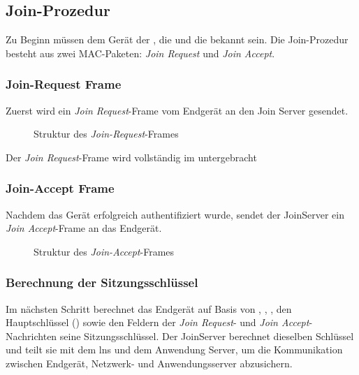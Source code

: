 \subsection{Join-Prozedur}
	Zu Beginn müssen dem Gerät der , die  und die  bekannt sein. Die Join-Prozedur besteht aus zwei MAC-Paketen: \textit{Join Request} und \textit{Join Accept}.

\subsubsection{Join-Request Frame}
	Zuerst wird ein \textit{Join Request}-Frame vom Endgerät an den Join Server gesendet.
	\begin{figure}[H]
		\centering
		\caption{Struktur des \textit{Join-Request}-Frames \cite{LoRaAlliance:2020b}}
	\end{figure}
		
 Der \textit{Join Request}-Frame wird vollständig im  untergebracht \cite{LoRaAlliance:2020b}
		 
		 
		 
\subsubsection{Join-Accept Frame}
	Nachdem das Gerät erfolgreich authentifiziert wurde, sendet der JoinServer ein \textit{Join Accept}-Frame an das Endgerät.
		\begin{figure}[H]
			\centering
			\caption{Struktur des \textit{Join-Accept}-Frames \cite{LoRaAlliance:2020b}}
		\end{figure}
\subsubsection{Berechnung der Sitzungsschlüssel}
	Im nächsten Schritt berechnet das Endgerät auf Basis von , , , den Hauptschlüssel () sowie den Feldern der \textit{Join Request}- und \textit{Join Accept}-Nachrichten seine Sitzungsschlüssel. Der JoinServer berechnet dieselben Schlüssel und teilt sie mit dem \ac{lns} und dem Anwendung Server, um die Kommunikation zwischen Endgerät, Netzwerk- und Anwendungsserver abzusichern.

